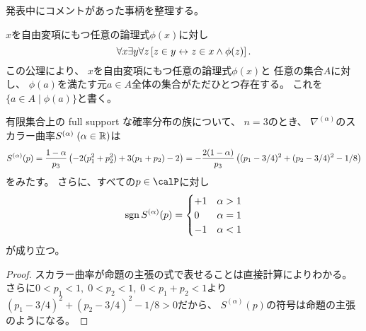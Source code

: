 \documentclass[report]{jlreq}
\begin{document}
%

発表中にコメントがあった事柄を整理する。

\begin{axiom}
    $x$を自由変項にもつ任意の論理式$\phi(x)$に対し
    \begin{equation}
        \forall x
        \exists y
        \forall z
        \left[{
            z \in y
            \leftrightarrow
            z \in x \land \phi(z)
        }\right].
    \end{equation}
    この公理により、
    $x$を自由変項にもつ任意の論理式$\phi(x)$と
    任意の集合$A$に対し、
    $\phi(a)$を満たす元$a \in A$全体の集合がただひとつ存在する。
    これを$\{ a \in A \mid \phi(a) \}$と書く。
\end{axiom}

\begin{axiom}
\end{axiom}

\begin{proposition}
    有限集合上の full support な確率分布の族について、
    $n = 3$のとき、
    $\nabla^{(\alpha)}$のスカラー曲率$S^{(\alpha)} \; (\alpha \in \mathbb{R})$は
    \begin{equation}
        S^{(\alpha)}(p)
            =
                \frac{1 - \alpha}{p_3} \left({
                    - 2(p_1^2 + p_2^2)
                    + 3(p_1 + p_2)
                    - 2
                }\right)
            =
                - \frac{2(1 - \alpha)}{p_3} \left({
                    (p_1 - 3/4)^2
                    + (p_2 - 3/4)^2
                    - 1/8
                }\right)
    \end{equation}
    をみたす。
    さらに、すべての$p \in \calP$に対し
    \begin{equation}
        \operatorname{sgn} S^{(\alpha)}(p)
            = \begin{cases}
                +1 & \alpha > 1 \\
                0  & \alpha = 1 \\
                -1 & \alpha < 1
            \end{cases}
    \end{equation}
    が成り立つ。
\end{proposition}

\begin{proof}
    スカラー曲率が命題の主張の式で表せることは直接計算によりわかる。
    さらに$0 < p_1 < 1, \; 0 < p_2 < 1, \; 0 < p_1 + p_2 < 1$より
    $(p_1 - 3/4)^2 + (p_2 - 3/4)^2 - 1/8 > 0$だから、
    $S^{(\alpha)}(p)$の符号は命題の主張のようになる。
\end{proof}
\end{document}
